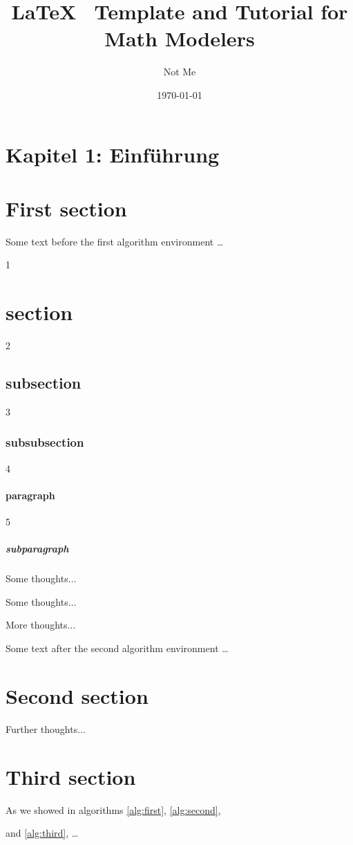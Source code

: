 \documentclass[12pt]{article}   %
\title{LaTeX \, Template and Tutorial for Math Modelers}
\author{Not Me}
\date{\today}
\begin{document}
\section{Kapitel 1: Einführung}


\section{First section}

Some text before the first algorithm environment \ldots

1	\section{section}
2	\subsection{subsection}
3	\subsubsection{subsubsection}
4	\paragraph{paragraph}
5	\subparagraph{subparagraph}

\begin{theorem}[Text]
Some thoughts$\ldots$ \label{alg:first}
\end{theorem}

\begin{lemma}{}
Some thoughts$\ldots$ \label{alg:first}
\end{lemma}

\begin{theorem}
More thoughts$\ldots$ \label{alg:second}
\end{theorem}

Some text after the second algorithm environment \ldots

\section{Second section}

\begin{theorem}
Further thoughts$\ldots$ \label{alg:third}
\end{theorem}

\section{Third section}

As we showed in algorithms \ref{alg:first}, \ref{alg:second}, 

and \ref{alg:third}, \ldots 
\end{document}
